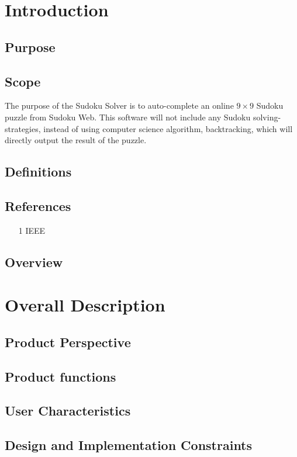 \documentclass{article}
\title{}
\author{}
\date{}
\begin{document}
\section{Introduction}
	\subsection{Purpose}

	\subsection{Scope}
	The purpose of the Sudoku Solver is to auto-complete an online $9 \times 
	9$ Sudoku puzzle from Sudoku Web. This software will not include any 
	Sudoku solving-strategies, instead of using computer science algorithm, 
	backtracking, which will directly output the result of the puzzle.  
	\subsection{Definitions}
	\subsection{References}
	\begin{itemize}
		\item[1] IEEE 
	\end{itemize}
	\subsection{Overview}

\section{Overall Description}
	\subsection{Product Perspective}
	\subsection{Product functions}
	\subsection{User Characteristics}
	\subsection{Design and Implementation Constraints}
\end{document}
